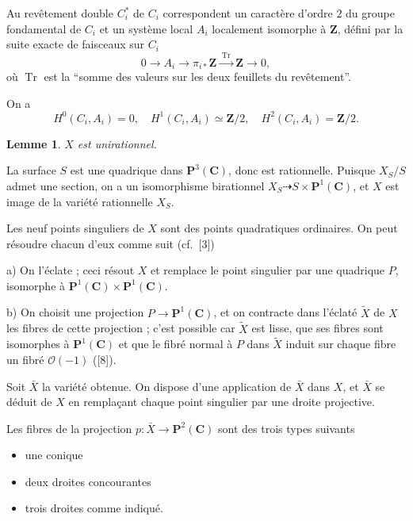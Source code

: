 \documentclass[12pt]{amsart}
\theoremstyle{plain}
\newtheorem{lemme}[theoreme]{Lemme}
\theoremstyle{definition}
\theoremstyle{remark}
\DeclareMathOperator{\Tr}{Tr}
\begin{document}
\medskip
Au rev\^etement double $C_i^*$ de $C_i$ correspondent un caract\`ere d'ordre $2$ du
groupe fondamental de $C_i$ et un syst\`eme local $A_i$ localement isomorphe \`a $\mathbf{Z}$,
d\'efini par la suite exacte de faisceaux sur $C_i$
\begin{equation}\label{eq:3.2}
0 \longrightarrow A_i \longrightarrow \pi_{i*} \mathbf{Z} \xrightarrow{\;\Tr\;} \mathbf{Z} \longrightarrow 0,
\end{equation}
o\`u $\Tr$ est la ``somme des valeurs sur les deux feuillets du rev\^etement''.

On a
\begin{equation}\label{eq:3.2coho}
H^0(C_i, A_i) = 0, \quad H^1(C_i, A_i) \simeq \mathbf{Z}/2, \quad H^2(C_i, A_i) = \mathbf{Z}/2.
\end{equation}

\begin{lemme}\label{lem:3.3}
$X$ est unirationnel.
\end{lemme}

La surface $S$ est une quadrique dans $\mathbf{P}^3(\mathbf{C})$, donc est rationnelle. Puisque
$X_S/S$ admet une section, on a un isomorphisme birationnel $X_S \dashrightarrow S \times \mathbf{P}^1(\mathbf{C})$, et
$X$ est image de la vari\'et\'e rationnelle $X_S$.

\medskip
Les neuf points singuliers de $X$ sont des points quadratiques ordinaires. On
peut r\'esoudre chacun d'eux comme suit (cf.\ [3])

a) On l'\'eclate ; ceci r\'esout $X$ et remplace le point singulier par une quadrique
$P$, isomorphe \`a $\mathbf{P}^1(\mathbf{C}) \times \mathbf{P}^1(\mathbf{C})$.

b) On choisit une projection $P \to \mathbf{P}^1(\mathbf{C})$, et on contracte dans l'\'eclat\'e $\tilde{X}$
de $X$ les fibres de cette projection ; c'est possible car $\tilde{X}$ est lisse, que ses
fibres sont isomorphes \`a $\mathbf{P}^1(\mathbf{C})$ et que le fibr\'e normal \`a $P$ dans $\tilde{X}$ induit
sur chaque fibre un fibr\'e $\mathcal{O}(-1)$ ([8]).

\medskip
Soit $\bar{X}$ la vari\'et\'e obtenue. On dispose d'une application de $\bar{X}$ dans $X$, et
$\bar{X}$ se d\'eduit de $X$ en rempla\c{c}ant chaque point singulier par une droite projective.

Les fibres de la projection $p: \bar{X} \to \mathbf{P}^2(\mathbf{C})$ sont des trois types suivants
\begin{itemize}
\item[$s \notin C_1 \cup C_2$] une conique
\item[$s \in C_1 \cup C_2$, $s \notin C_1 \cap C_2$] deux droites concourantes
\item[$s \in C_1 \cap C_2$] trois droites comme indiqu\'e.
\end{itemize}
\end{document}
